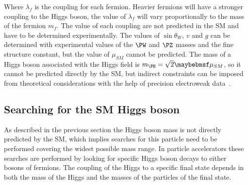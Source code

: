 Where $\lambda_{f}$ is the coupling for each fermion. Heavier fermions will have a stronger coupling to the Higgs boson, the value of $\lambda_{f}$ will vary proportionally to the mass of the fermion $m_{f}$. The value of each coupling are not predicted in the \gls{SM} and have to be determined experimentally. The values of $\sin{\theta_{W}}$, $v$ and $g$ can be determined with experimental values of the $\PW$ and $\PZ$ masses and the fine structure constant, but the value of $\mu_{SM}$ cannot be predicted. The mass of a Higgs boson associated with the Higgs field is $m_{\PH}=\sqrt{2}\mu_{SM}$, so it cannot be predicted directly by the \gls{SM}, but indirect constraints can be imposed from theoretical considerations with the help of precision electroweak data~\cite{SITE:lepewwg}.

\subsection{Searching for the SM Higgs boson}
\label{SUBSECTION:Theory_SM_SearchingSMHiggs}


As described in the previous section the Higgs boson mass is not directly predicted by the \gls{SM}, which implies searches for this particle need to be performed covering the widest possible mass range. In particle accelerators these searches are performed by looking for specific Higgs boson decays to either bosons of fermions. The coupling of the Higgs to a specific final state depends in both the mass of the Higgs and the masses of the particles of the final state. 

